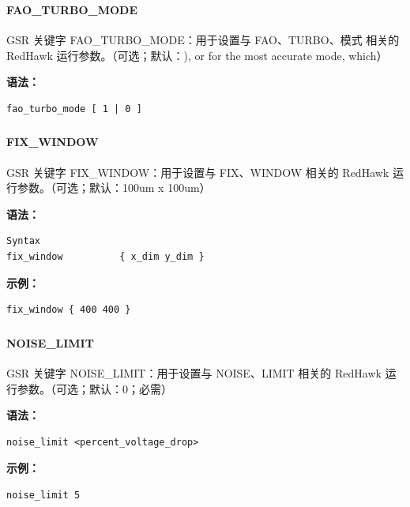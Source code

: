 \subsubsection{}
\paragraph*{FAO_TURBO_MODE}

GSR 关键字 FAO_TURBO_MODE：用于设置与 FAO、TURBO、模式 相关的 RedHawk 运行参数。（可选；默认：), or for the most accurate mode, which）

\textbf{语法：}
\begin{lstlisting}
fao_turbo_mode [ 1 | 0 ]
\end{lstlisting}

\subsubsection{}
\paragraph*{FIX_WINDOW}

GSR 关键字 FIX_WINDOW：用于设置与 FIX、WINDOW 相关的 RedHawk 运行参数。（可选；默认：100um x 100um）

\textbf{语法：}
\begin{lstlisting}
Syntax
fix_window          { x_dim y_dim }
\end{lstlisting}

\textbf{示例：}
\begin{lstlisting}
fix_window { 400 400 }
\end{lstlisting}

\subsubsection{}
\paragraph*{NOISE_LIMIT}

GSR 关键字 NOISE_LIMIT：用于设置与 NOISE、LIMIT 相关的 RedHawk 运行参数。（可选；默认：0；必需）

\textbf{语法：}
\begin{lstlisting}
noise_limit <percent_voltage_drop>
\end{lstlisting}

\textbf{示例：}
\begin{lstlisting}
noise_limit 5
\end{lstlisting}

